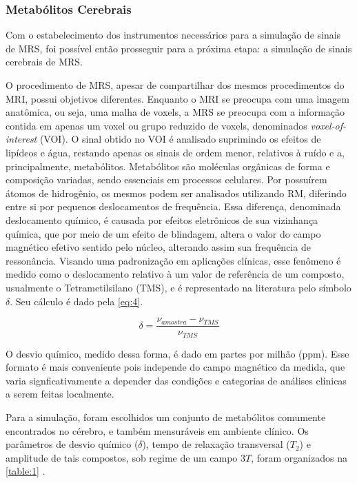 \documentclass[
12pt,		
twoside, 
a4paper,
chapter=TITLE,
english,			
brazil]{USPSC-classe/USPSC}
\begin{document}
\subsubsection{Metabólitos Cerebrais}
\label{sec:metabolites}

Com o estabelecimento dos instrumentos necessários para a simulação de sinais de MRS, foi possível então prosseguir para a próxima etapa:
a simulação de sinais cerebrais de MRS.

O procedimento de MRS, apesar de compartilhar dos mesmos procedimentos do MRI, possui objetivos 
diferentes. Enquanto o MRI se preocupa com uma imagem anatômica, ou seja, uma malha de voxels, a MRS se preocupa com a informação contida em apenas um voxel ou grupo 
reduzido de voxels, denominados \textit{voxel-of-interest} (VOI). O sinal obtido no VOI é analisado suprimindo os efeitos de lipídeos e água, restando 
apenas os sinais de ordem menor, relativos à ruído e a, principalmente, metabólitos. Metabólitos são moléculas orgânicas de forma e composição 
variadas, sendo essenciais em processos celulares. Por possuírem átomos de hidrogênio, os mesmos podem ser analisados utilizando RM, diferindo entre si por pequenos 
deslocamentos de frequência. Essa diferença, denominada deslocamento químico, é causada por efeitos eletrônicos de sua vizinhança química, que por meio de um efeito de blindagem, 
altera o valor do campo magnético efetivo sentido pelo núcleo, alterando assim sua frequência de ressonância. Visando uma padronização em aplicações clínicas, esse fenômeno é medido 
como o deslocamento relativo à um valor de referência de um composto, usualmente o Tetrametilsilano (TMS), e é representado na literatura pelo símbolo $\delta$. Seu cálculo é dado pela \autoref{eq:4}.

\begin{equation} \label{eq:4}
    \delta = \frac{\nu _{amostra} - \nu _{TMS}}{\nu _{TMS}}
\end{equation}

O desvio químico, medido dessa forma, é dado em partes por milhão (ppm). Esse formato é mais conveniente pois independe do campo magnético da medida, que varia signficativamente a depender das 
condições e categorias de análises clínicas a serem feitas localmente.

Para a simulação, foram escolhidos um conjunto de metabólitos comumente encontrados no cérebro, e também mensuráveis em ambiente clínico. Os parâmetros de desvio químico ($\delta$), tempo de relaxação 
transversal ($T_2$) e amplitude de tais compostos, sob regime de um campo $3T$, foram organizados na \autoref{table:1} \cite{Silva2020-io}.
\end{document}
